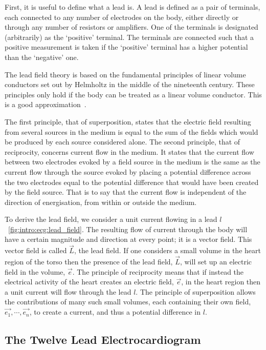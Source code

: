 First, it is useful to define what a lead is.
A lead is defined as a pair of terminals, each connected to any number of electrodes
on the body, either directly or through any number of resistors or amplifiers.
One of the terminals is designated (arbitrarily) as the `positive' terminal.
The terminals are connected such that a positive measurement is taken if
the `positive' terminal has a higher potential than the `negative' one.

The lead field theory is based on the fundamental principles of linear volume
conductors set out by Helmholtz in the middle of the nineteenth century.
These principles only hold if the body can be treated as a linear volume
conductor.
This is a good approximation~\cite{REFS}.

The first principle, that of superposition, states that the electric field
resulting from several sources in the medium is equal to the sum of the fields
which would be produced by each source considered alone.
The second principle, that of reciprocity, concerns current flow in the
medium.
It states that the current flow between two electrodes evoked by a field source in the
medium is the same as the current flow through the source evoked by placing a
potential difference across the two electrodes equal to the potential difference
that would have been created by the field source.
That is to say that the current flow is independent of the direction of
energisation, from within or outside the medium.

To derive the lead field, we consider a unit current flowing in a
lead $l$~\ref{fig:intro:ecg:lead_field}.
The resulting flow of current through the body will have a certain magnitude and
direction at every point; it is a vector field.
This vector field is called $\vec{L}$, the lead field.
If one considers a small volume in the heart region of the torso then the
presence of the lead field, $\vec{L}$, will set up an electric field in the
volume, $\vec{e}$.
The principle of reciprocity means that if instead the electrical activity of
the heart creates an electric field, $\vec{e}$, in the heart region then a unit
current will flow through the lead $l$.
The principle of superposition allows the contributions of many such small
volumes, each containing their own field, $\vec{e_1},\cdots,\vec{e_n}$, to
create a current, and thus a potential difference in $l$.


\subsection{The Twelve Lead Electrocardiogram}

